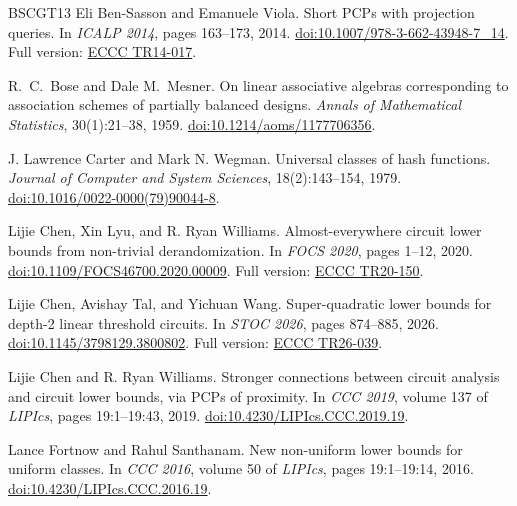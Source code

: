 \documentclass[11pt,letterpaper]{article}
\theoremstyle{definition}
\theoremstyle{remark}
\begin{document}
\begin{thebibliography}{BSCGT13}
Eli Ben-Sasson and Emanuele Viola.
\newblock Short PCPs with projection queries.
\newblock In \emph{ICALP 2014}, pages 163--173, 2014.
\newblock \href{https://doi.org/10.1007/978-3-662-43948-7_14}{doi:10.1007/978-3-662-43948-7\_14}.
Full version: \href{https://eccc.weizmann.ac.il/report/2014/017/}{ECCC TR14-017}.

R.~C.~Bose and Dale M.~Mesner.
\newblock On linear associative algebras corresponding to association
  schemes of partially balanced designs.
\newblock \emph{Annals of Mathematical Statistics}, 30(1):21--38, 1959.
\newblock \href{https://doi.org/10.1214/aoms/1177706356}{doi:10.1214/aoms/1177706356}.

J. Lawrence Carter and Mark N. Wegman.
\newblock Universal classes of hash functions.
\newblock \emph{Journal of Computer and System Sciences}, 18(2):143--154, 1979.
\newblock \href{https://doi.org/10.1016/0022-0000(79)90044-8}{doi:10.1016/0022-0000(79)90044-8}.

Lijie Chen, Xin Lyu, and R. Ryan Williams.
\newblock Almost-everywhere circuit lower bounds from non-trivial derandomization.
\newblock In \emph{FOCS 2020}, pages 1--12, 2020.
\newblock \href{https://doi.org/10.1109/FOCS46700.2020.00009}{doi:10.1109/FOCS46700.2020.00009}.
Full version: \href{https://eccc.weizmann.ac.il/report/2020/150/}{ECCC TR20-150}.

Lijie Chen, Avishay Tal, and Yichuan Wang.
\newblock Super-quadratic lower bounds for depth-2 linear threshold circuits.
\newblock In \emph{STOC 2026}, pages 874--885, 2026.
\newblock \href{https://doi.org/10.1145/3798129.3800802}{doi:10.1145/3798129.3800802}.
Full version: \href{https://eccc.weizmann.ac.il/report/2026/039/}{ECCC TR26-039}.

Lijie Chen and R. Ryan Williams.
\newblock Stronger connections between circuit analysis and circuit lower bounds, via PCPs of proximity.
\newblock In \emph{CCC 2019}, volume 137 of \emph{LIPIcs}, pages 19:1--19:43, 2019.
\newblock \href{https://doi.org/10.4230/LIPIcs.CCC.2019.19}{doi:10.4230/LIPIcs.CCC.2019.19}.

Lance Fortnow and Rahul Santhanam.
\newblock New non-uniform lower bounds for uniform classes.
\newblock In \emph{CCC 2016}, volume 50 of \emph{LIPIcs}, pages 19:1--19:14, 2016.
\newblock \href{https://doi.org/10.4230/LIPIcs.CCC.2016.19}{doi:10.4230/LIPIcs.CCC.2016.19}.


\end{thebibliography}
\end{document}

